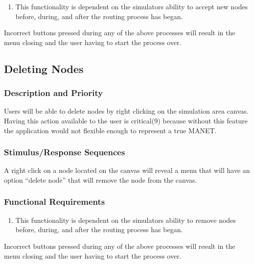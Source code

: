 \documentclass[a4paper,11pt,titlepage]{article}
\begin{document}
\begin{enumerate}[{\bf {REQ} 1}]
  \item This functionality is dependent on the simulators ability to accept new nodes
before, during, and after the routing process has began.
\end{enumerate}

\begin{description}[\breaklabel] 
  \item[Errors] Incorrect buttons pressed during any of the above processes will result in the
   menu closing and the user having to start the process over.
\end{description}

\subsection{Deleting Nodes}

\subsubsection{Description and Priority}
Users will be able to delete nodes by right clicking on the simulation area canvas.
Having this action available to the user is critical(9) because without this feature the
application would not flexible enough to represent a true MANET.

\subsubsection{Stimulus/Response Sequences}
A right click on a node located on the canvas will reveal a menu that will have an
option “delete node” that will remove the node from the canvas.

\subsubsection{Functional Requirements}

\begin{enumerate}[{\bf {REQ} 1}]
  \item This functionality is dependent on the simulators ability to remove nodes
before, during, and after the routing process has began.
\end{enumerate}

\begin{description}[\breaklabel]
  \item[Errors] Incorrect buttons pressed during any of the above processes will result in the
menu closing and the user having to start the process over.
\end{description}
\end{document}
